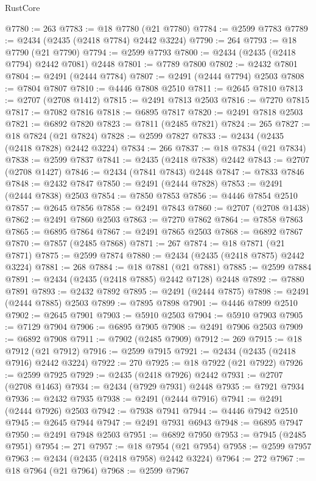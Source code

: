 \begin{lexlean}{RustCore}
\begin{coremodule}
@7780 := 263
@7783 := @18 @7780 (@21 @7780)
@7784 := @2599 @7783
@7789 := @2434 (@2435 (@2418 @7784) @2442 @3224)
@7790 := 264
@7793 := @18 @7790 (@21 @7790)
@7794 := @2599 @7793
@7800 := @2434 (@2435 (@2418 @7794) @2442 @7081) @2448
@7801 := @7789 @7800
@7802 := @2432 @7801
@7804 := @2491 (@2444 @7784)
@7807 := @2491 (@2444 @7794) @2503
@7808 := @7804 @7807
@7810 := @4446 @7808 @2510
@7811 := @2645 @7810
@7813 := @2707 (@2708 @1412)
@7815 := @2491 @7813 @2503
@7816 := @7270 @7815
@7817 := @7082 @7816
@7818 := @6895 @7817
@7820 := @2491 @7818 @2503
@7821 := @6892 @7820
@7823 := @7811 (@2485 @7821)
@7824 := 265
@7827 := @18 @7824 (@21 @7824)
@7828 := @2599 @7827
@7833 := @2434 (@2435 (@2418 @7828) @2442 @3224)
@7834 := 266
@7837 := @18 @7834 (@21 @7834)
@7838 := @2599 @7837
@7841 := @2435 (@2418 @7838) @2442
@7843 := @2707 (@2708 @1427)
@7846 := @2434 (@7841 @7843) @2448
@7847 := @7833 @7846
@7848 := @2432 @7847
@7850 := @2491 (@2444 @7828)
@7853 := @2491 (@2444 @7838) @2503
@7854 := @7850 @7853
@7856 := @4446 @7854 @2510
@7857 := @2645 @7856
@7858 := @2491 @7843
@7860 := @2707 (@2708 @1438)
@7862 := @2491 @7860 @2503
@7863 := @7270 @7862
@7864 := @7858 @7863
@7865 := @6895 @7864
@7867 := @2491 @7865 @2503
@7868 := @6892 @7867
@7870 := @7857 (@2485 @7868)
@7871 := 267
@7874 := @18 @7871 (@21 @7871)
@7875 := @2599 @7874
@7880 := @2434 (@2435 (@2418 @7875) @2442 @3224)
@7881 := 268
@7884 := @18 @7881 (@21 @7881)
@7885 := @2599 @7884
@7891 := @2434 (@2435 (@2418 @7885) @2442 @7128) @2448
@7892 := @7880 @7891
@7893 := @2432 @7892
@7895 := @2491 (@2444 @7875)
@7898 := @2491 (@2444 @7885) @2503
@7899 := @7895 @7898
@7901 := @4446 @7899 @2510
@7902 := @2645 @7901
@7903 := @5910 @2503
@7904 := @5910 @7903
@7905 := @7129 @7904
@7906 := @6895 @7905
@7908 := @2491 @7906 @2503
@7909 := @6892 @7908
@7911 := @7902 (@2485 @7909)
@7912 := 269
@7915 := @18 @7912 (@21 @7912)
@7916 := @2599 @7915
@7921 := @2434 (@2435 (@2418 @7916) @2442 @3224)
@7922 := 270
@7925 := @18 @7922 (@21 @7922)
@7926 := @2599 @7925
@7929 := @2435 (@2418 @7926) @2442
@7931 := @2707 (@2708 @1463)
@7934 := @2434 (@7929 @7931) @2448
@7935 := @7921 @7934
@7936 := @2432 @7935
@7938 := @2491 (@2444 @7916)
@7941 := @2491 (@2444 @7926) @2503
@7942 := @7938 @7941
@7944 := @4446 @7942 @2510
@7945 := @2645 @7944
@7947 := @2491 @7931 @6943
@7948 := @6895 @7947
@7950 := @2491 @7948 @2503
@7951 := @6892 @7950
@7953 := @7945 (@2485 @7951)
@7954 := 271
@7957 := @18 @7954 (@21 @7954)
@7958 := @2599 @7957
@7963 := @2434 (@2435 (@2418 @7958) @2442 @3224)
@7964 := 272
@7967 := @18 @7964 (@21 @7964)
@7968 := @2599 @7967

\end{coremodule}
\end{lexlean}
